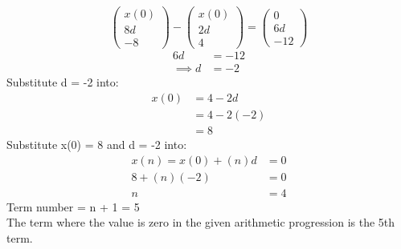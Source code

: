 \documentclass[journal,12pt,twocolumn]{IEEEtran}
\theoremstyle{remark}
\begin{document}
\begin{equation}
\left(
\begin{array}{r}
x(0) \\
8d \\
-8 
\end{array}
\right)
-
\left(
\begin{array}{r}
x(0) \\
2d \\
4
\end{array}
\right)
=
\left(
\begin{array}{r}
0 \\
6d \\
-12
\end{array}
\right)
\end{equation}
\begin{align}
6d &= -12 \\
\implies d &= -2 
\end{align}
Substitute d = -2 into:
\begin{align}
x(0) &= 4 - 2d\\
&= 4 - 2(-2)\\
&= 8
\end{align}
Substitute x(0) = 8 and d = -2 into:
\begin{align}
x(n) = x(0) + (n)d &= 0 \\
8 + (n)(-2) &= 0 \\
n &= 4
\end{align}
Term number = n + 1 = 5 \\
The term where the value is zero in the given arithmetic progression is the 5th term.\\
\end{document}
